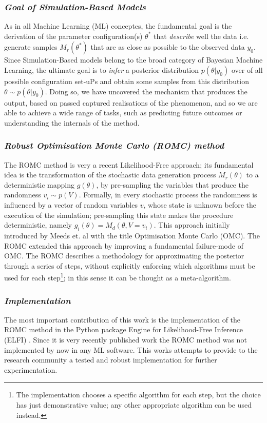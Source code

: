 \subsubsection*{\textit{Goal of Simulation-Based Models}}

As in all Machine Learning (ML) conceptes, the fundamental goal is the
derivation of the parameter configuration(s) $\theta^*$ that
\textit{describe} well the data i.e. generate samples $M_r(\theta^*)$
that are as close as possible to the observed data $y_0$. Since
Simulation-Based models belong to the broad category of Bayesian
Machine Learning, the ultimate goal is to \textit{infer} a posterior
distribution $p(\theta|y_0)$ over of all possible configuration
set-uPs and obtain some samples from this distribution
$\theta \sim p(\theta|y_0)$. Doing so, we have uncovered the mechanism
that produces the output, based on passed captured realisations of the
phenomenon, and so we are able to achieve a wide range of tasks, such
as predicting future outcomes or understanding the internals of the
method.

\subsubsection*{\textit{Robust Optimisation Monte Carlo (ROMC) method}}

The ROMC method \cite{Ikonomov2019} is very a recent Likelihood-Free
approach; its fundamental idea is the transformation of the stochastic
data generation process $M_r(\theta)$ to a deterministic mapping
$g(\theta)$, by pre-sampling the variables that produce the randomness
$v_i \sim p(V)$. Formally, in every stochastic process the randomness
is influenced by a vector of random variables $v$, whose state is
unknown before the execution of the simulation; pre-sampling this
state makes the procedure deterministic, namely
$g_i(\theta) = M_d(\theta, V=v_i)$. This approach initially introduced
by Meeds et. al \cite{Meeds2015} with the title Optimisation Monte
Carlo (OMC). The ROMC extended this approach by improving a
fundamental failure-mode of OMC. The ROMC describes a methodology for
approximating the posterior through a series of steps, without
explicitly enforcing which algorithms must be used for each
step\footnote{The implementation chooses a specific algorithm for each
  step, but the choice has just demonstrative value; any other
  appropriate algorithm can be used instead.}; in this sense it can be
thought as a meta-algorithm.

\subsubsection*{\textit{Implementation}}

The most important contribution of this work is the implementation of
the ROMC method in the Python package Engine for Likelihood-Free
Inference (ELFI) \cite{1708.00707}. Since it is very recently
published work the ROMC method was not implemented by now in any ML
software. This works attempts to provide to the research community a
tested and robust implementation for further experimentation.
